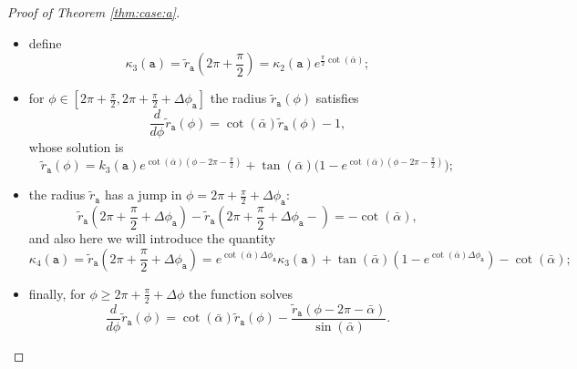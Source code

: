 \documentclass[reqno]{amsart}
\theoremstyle{definition} \newtheorem{definition}{Definition}[section]
\theoremstyle{definition} \newtheorem{remark}[definition]{Remark}
\theoremstyle{plain} \newtheorem{lemma}[definition]{Lemma}
\theoremstyle{plain} \newtheorem{proposition}[definition]{Proposition}
\theoremstyle{plain} \newtheorem{theorem}[definition]{Theorem}
\theoremstyle{plain} \newtheorem{corollary}[definition]{Corollary}
\theoremstyle{definition} \newtheorem{example}[definition]{Example}
\theoremstyle{plain} \newtheorem{claim}[clai]{Claim}
\theoremstyle{definition} \newtheorem{assumption}[definition]{Assumption}
\theoremstyle{definition} \newtheorem{observation}[definition]{Observation}
\newcommand{\1}{\mathbbm 1}
\numberwithin{equation}{section} %
\theoremstyle{plain} \newtheorem*{theorem*}{Theorem}
\theoremstyle{plain} \newtheorem{mthm}[maintheorem]{Main Theorem}
\theoremstyle{plain} \newtheorem*{mthm*}{Main Theorem}
\theoremstyle{plain} \newtheorem*{conjecture*}{Conjecture}
\theoremstyle{plain} \newtheorem{conjecture}[definition]{Conjecture}
\theoremstyle{plain} \newtheorem*{problem*}{Problem}
\begin{document}
\begin{proof}[Proof of Theorem \ref{thm:case:a}]
\begin{itemize}
\begin{equation*}
\end{equation*}
\item define
$$
\kappa_3(\mathtt a) = \tilde r_{\mathtt a} \left( 2\pi + \frac{\pi}{2} \right) = \kappa_2(\mathtt a) e^{\frac{\pi}{2}\cot(\bar\alpha)};
$$
\item for $\phi \in \left[ 2\pi + \frac{\pi}{2}, 2\pi + \frac{\pi}{2} + \Delta\phi_{\mathtt a} \right]$ the radius $\tilde r_{\mathtt a}(\phi)$ satisfies
\begin{equation*}
\frac{d}{d\phi} \tilde r_{\mathtt a}(\phi) = \cot(\bar\alpha) \tilde r_{\mathtt a}(\phi) - 1,
\end{equation*}
whose solution is
\begin{equation*}
\tilde r_{\mathtt a}(\phi) = k_3(\mathtt a) e^{\cot(\bar \alpha)(\phi - 2\pi - \frac{\pi}{2})} + \tan(\bar \alpha) \big( 1 - e^{\cot(\bar \alpha)(\phi - 2\pi - \frac{\pi}{2})} \big);
\end{equation*}
\item the radius $\tilde r_{\mathtt a}$ has a jump in $\phi = 2\pi + \frac{\pi}{2} + \Delta\phi_{\mathtt a}$: 
\begin{equation*}
\tilde r_{\mathtt a} \left( 2\pi + \frac{\pi}{2} + \Delta \phi_{\mathtt a} \right) -\tilde r_{\mathtt a} \left( 2\pi + \frac{\pi}{2} + \Delta \phi_{\mathtt a} - \right) = - \cot(\bar \alpha),
\end{equation*}
and also here we will introduce the quantity
\begin{equation*}
\kappa_4(\mathtt a) = \tilde r_{\mathtt a} \left(2\pi+\frac{\pi}{2}+\Delta\phi_{\mathtt a} \right) = e^{\cot(\bar \alpha) \Delta \phi_{\mathtt a}} \kappa_3(\mathtt a) + \tan(\bar \alpha) \left( 1 - e^{\cot(\bar \alpha)\Delta \phi_{\mathtt a}} \right) - \cot(\bar \alpha);
\end{equation*}
\item finally, for $\phi \geq 2\pi + \frac{\pi}{2} + \Delta \phi$ the function solves
\begin{equation*}
\frac{d}{d\phi} \tilde r_{\mathtt a}(\phi) = \cot(\bar \alpha) \tilde r_{\mathtt a}(\phi) -\frac{\tilde r_{\mathtt a}(\phi - 2\pi - \bar \alpha)}{\sin(\bar \alpha)}.
\end{equation*}
\end{itemize}


\end{proof}
\end{document}
